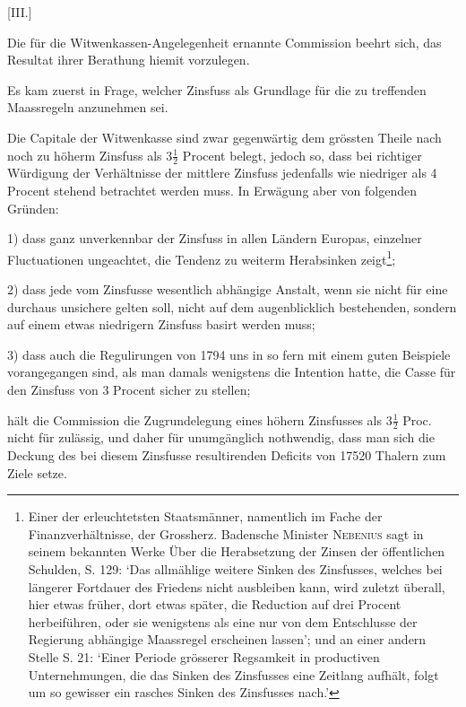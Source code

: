 \par\bigskip{}
\begin{center}
[III.]\par{}
\end{center}
\noindent\hspace*{\parindent}Die für die Witwenkassen-Angelegenheit ernannte Commission beehrt sich, das Resultat ihrer Berathung hiemit vorzulegen.

Es kam zuerst in Frage, welcher Zinsfuss als Grundlage für die zu treffenden Maassregeln anzunehmen sei.

Die Capitale der Witwenkasse sind zwar gegenwärtig dem grössten Theile nach noch zu höherm Zinsfuss als \(3\tfrac{1}{2}\) Procent belegt, jedoch so, dass bei richtiger Würdigung der Verhältnisse der mittlere Zinsfuss jedenfalls wie niedriger als 4 Procent stehend betrachtet werden muss. In Erwägung aber von folgenden Gründen:

1) dass ganz unverkennbar der Zinsfuss in allen Ländern Europas, einzelner Fluctuationen ungeachtet, die Tendenz zu weiterm Herabsinken zeigt\footnote{Einer der erleuchtetsten Staatsmänner, namentlich im Fache der Finanzverhältnisse, der Grossherz. Badensche Minister \textsc{Nebenius} sagt in seinem bekannten Werke Über die Herabsetzung der Zinsen der öffentlichen Schulden, S. 129: ‘Das allmählige weitere Sinken des Zinsfusses, welches bei längerer Fortdauer des Friedens nicht ausbleiben kann, wird zuletzt überall, hier etwas früher, dort etwas später, die Reduction auf drei Procent herbeiführen, oder sie wenigstens als eine nur von dem Entschlusse der Regierung abhängige Maassregel erscheinen lassen’; und an einer andern Stelle S. 21: ‘Einer Periode grösserer Regsamkeit in productiven Unternehmungen, die das Sinken des Zinsfusses eine Zeitlang aufhält, folgt um so gewisser ein rasches Sinken des Zinsfusses nach.’};

2) dass jede vom Zinsfusse wesentlich abhängige Anstalt, wenn sie nicht für eine durchaus unsichere gelten soll, nicht auf dem augenblicklich bestehenden, sondern auf einem etwas niedrigern Zinsfuss basirt werden muss;

3) dass auch die Regulirungen von 1794 uns in so fern mit einem guten Beispiele vorangegangen sind, als man damals wenigstens die Intention hatte, die Casse für den Zinsfuss von 3 Procent sicher zu stellen;

\noindent hält die Commission die Zugrundelegung eines höhern Zinsfusses als \(3\tfrac{1}{2}\) Proc. nicht für zulässig, und daher für unumgänglich nothwendig, dass man sich die Deckung des bei diesem Zinsfusse resultirenden Deficits von 17520 Thalern zum Ziele setze.

